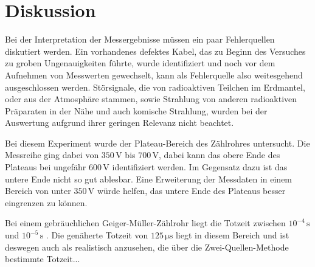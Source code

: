 \section{Diskussion}
\label{sec:Diskussion}

Bei der Interpretation der Messergebnisse müssen ein paar Fehlerquellen diskutiert werden.
Ein vorhandenes defektes Kabel, das zu Beginn des Versuches zu groben Ungenauigkeiten führte,
wurde identifiziert und noch vor dem Aufnehmen von Messwerten gewechselt, kann als Fehlerquelle also
weitesgehend ausgeschlossen werden.
Störsignale, die von radioaktiven Teilchen im Erdmantel, oder aus der Atmosphäre stammen, sowie Strahlung von anderen radioaktiven Präparaten in der Nähe und auch komische Strahlung, 
wurden bei der Auswertung aufgrund ihrer geringen Relevanz nicht beachtet.

Bei diesem Experiment wurde der Plateau-Bereich des Zählrohres untersucht. Die Messreihe ging dabei von $350 \,\unit{\volt}$ bis $700 \,\unit{\volt}$, dabei kann das obere Ende des Plateaus bei ungefähr $600 \, \unit{\volt}$ identifiziert werden.
Im Gegensatz dazu ist das untere Ende nicht so gut ablesbar. Eine Erweiterung der Messdaten in einem Bereich von unter $350 \, \unit{\volt}$ würde helfen, das untere Ende des Plateaus besser eingrenzen zu können.

Bei einem gebräuchlichen Geiger-Müller-Zählrohr liegt die Totzeit zwischen $10^{-4} \, \unit{\second}$ und $10^{-5} \, \unit{\second}$ \cite{ap01}.
Die genäherte Totzeit von $ 125 \,\unit{\micro\second}$ liegt in diesem Bereich und ist deswegen auch als realistisch anzusehen,
die über die Zwei-Quellen-Methode bestimmte Totzeit... %


